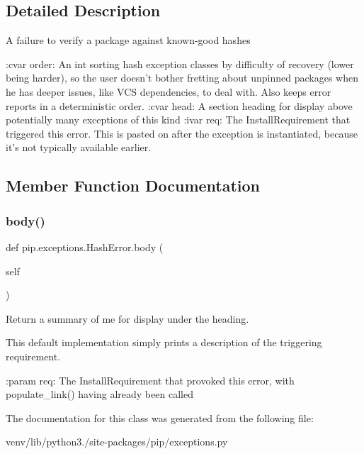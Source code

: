 \subsection{Detailed Description}
\begin{DoxyVerb}A failure to verify a package against known-good hashes

:cvar order: An int sorting hash exception classes by difficulty of
    recovery (lower being harder), so the user doesn't bother fretting
    about unpinned packages when he has deeper issues, like VCS
    dependencies, to deal with. Also keeps error reports in a
    deterministic order.
:cvar head: A section heading for display above potentially many
    exceptions of this kind
:ivar req: The InstallRequirement that triggered this error. This is
    pasted on after the exception is instantiated, because it's not
    typically available earlier.\end{DoxyVerb}
 

\subsection{Member Function Documentation}
\mbox{\label{classpip_1_1exceptions_1_1_hash_error_ad40d9767743dd1fe1dc4b6c0fd4da430}} 
\subsubsection{\texorpdfstring{body()}{body()}}
{\footnotesize\ttfamily def pip.\+exceptions.\+Hash\+Error.\+body (\begin{DoxyParamCaption}\item[{}]{self }\end{DoxyParamCaption})}

\begin{DoxyVerb}Return a summary of me for display under the heading.

This default implementation simply prints a description of the
triggering requirement.

:param req: The InstallRequirement that provoked this error, with
    populate_link() having already been called\end{DoxyVerb}
 

The documentation for this class was generated from the following file\+:\begin{DoxyCompactItemize}
\item 
venv/lib/python3./site-\/packages/pip/exceptions.\+py\end{DoxyCompactItemize}
